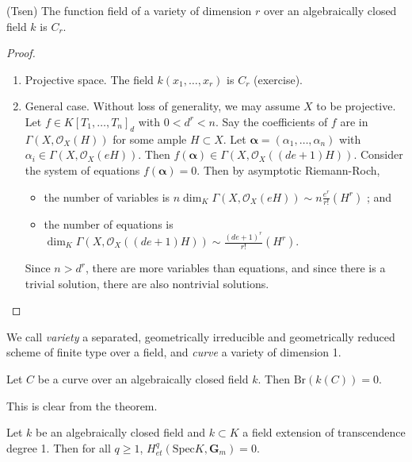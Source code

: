 \begin{theorem}
\label{theorem-tsen}
(Tsen)
The function field of a variety of dimension $r$ over an algebraically closed
field $k$ is $C_r$.
\end{theorem}

\begin{proof}
\begin{enumerate}
\item
Projective space. The field $k(x_1, \ldots, x_r)$ is $C_r$ (exercise).
\item
General case. Without loss of generality, we may assume $X$ to be projective.
Let $f \in K[T_1, \dots, T_n]_d$ with $0 < d^r <n$. Say the coefficients of $f$
are in $\Gamma(X,\mathcal{O}_X(H))$ for some ample $H \subset X$. Let
$\mathbf{\alpha} = (\alpha_1, \dots, \alpha_n)$ with $\alpha_i \in \Gamma(X,
\mathcal{O}_X(eH))$. Then $f(\mathbf{\alpha}) \in \Gamma(X,
\mathcal{O}_X((de+1)H))$. Consider the system of equations $f(\mathbf{\alpha})
=0$. Then by asymptotic Riemann-Roch,
\begin{itemize}
\item
the number of variables is $n\dim_K \Gamma(X,\mathcal{O}_X(eH)) \sim
n\frac{e^r}{r!} (H^r)$ ; and
\item
the number of equations is $\dim_K \Gamma(X,\mathcal{O}_X((de+1)H)) \sim
\frac{(de+1)^r}{r!} (H^r).$
\end{itemize}
Since $n> d^r$, there are more variables than equations, and since there is a
trivial solution, there are also nontrivial solutions.
\end{enumerate}
\end{proof}

\begin{definition}
\label{definition-variety}
We call {\it variety} a separated, geometrically irreducible and geometrically
reduced scheme of finite type over a field, and {\it curve} a variety of
dimension 1.
\end{definition}

\begin{lemma}
\label{lemma-curve-brauer-zero}
Let $C$ be a curve over an algebraically closed field $k$. Then
$\text{Br}(k(C)) = 0$.
\end{lemma}

\noindent
This is clear from the theorem.

\begin{lemma}
\label{lemma-cohomology-Gm-function-field-curve}
Let $k$ be an algebraically closed field and $k \subset K$ a field extension
of transcendence degree 1. Then for all $q \geq 1$, $H_{et}^q(\text{Spec} K,
\mathbf{G}_m) = 0$.
\end{lemma}

